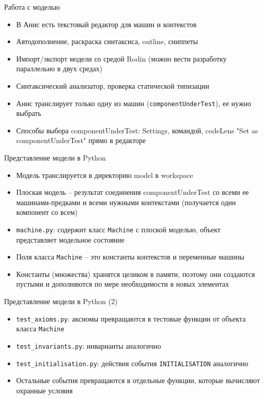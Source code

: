 \documentclass[hyperref={unicode=true}]{beamer}
\begin{document}
    \begin{frame}{Работа с моделью}
    \begin{itemize}
    \item В Анис есть текстовый редактор для машин и контекстов
    \item Автодополнение, раскраска синтаксиса, outline, сниппеты
    \item Импорт/экспорт модели со средой Rodin (можно вести разработку
          параллельно в двух средах)
    \item Синтаксический анализатор, проверка статической типизации 
    \item Анис транслирует только одну из машин (\texttt{componentUnderTest}), ее нужно выбрать
    \item Способы выбора componentUnderTest: Settings, командой,
          codeLens "Set as componentUnderTest" прямо в редакторе
    \end{itemize}
    \end{frame}

    \begin{frame}{Представление модели в Python}
    \begin{itemize}
    \item Модель транслируется в директорию model в workspace
    \item Плоская модель -- результат соединения componentUnderTest
          со всеми ее машинами-предками и всеми нужными контекстами
          (получается один компонент со всем)
    \item \texttt{machine.py}: содержит класс \texttt{Machine}
          с плоской моделью, объект представляет модельное состояние
    \item Поля класса \texttt{Machine} -- это константы контекстов
          и переменные машины
    \item Константы (множества) хранятся целиком в памяти, поэтому
          они создаются пустыми и дополняются по мере необходимости в новых элементах
    
    \end{itemize}
    \end{frame}

    \begin{frame}{Представление модели в Python (2)}
    \begin{itemize}
    \item \texttt{test\_axioms.py}: аксиомы превращаются в тестовые
          функции от объекта класса \texttt{Machine}
    \item \texttt{test\_invariants.py}: инварианты аналогично
    \item \texttt{test\_initialisation.py}: действия события
          \texttt{INITIALISATION} аналогично
    \item Остальные события превращаются в отдельные функции, которые
          вычисляют охранные условия
    \end{itemize}
    \end{frame}
\end{document}
